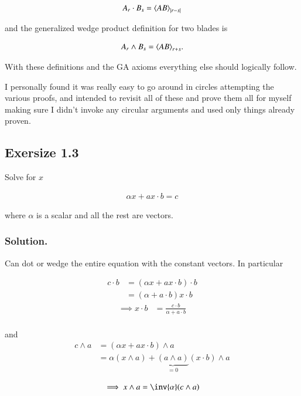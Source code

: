 \documentclass{article}
\begin{document}
\begin{align}\label{eqn:generalDot}
A_r \cdot B_s = {\left\langle{{A B}}\right\rangle}_{{\left\lvert{r -s}\right\rvert}}
\end{align}

and the generalized wedge product definition for two blades is 

\begin{align}\label{eqn:generalWedge}
A_r \wedge B_s = {\left\langle{{A B}}\right\rangle}_{r + s}.
\end{align}

With these definitions and the GA axioms everything else should logically follow.

I personally found it was really easy to go around in circles attempting the various proofs, and intended to revisit all of these
and prove them all for myself making sure I didn't invoke any circular arguments and used only things already proven.

\subsection{ Exersize 1.3 }

Solve for $x$

\begin{align*}
\alpha x + a x \cdot b = c
\end{align*}

where $\alpha$ is a scalar and all the rest are vectors.

\subsubsection{ Solution. }

Can dot or wedge the entire equation with the constant vectors.  In particular

\begin{align*}
c \cdot b &= (\alpha x + a x \cdot b) \cdot b \\ 
&= (\alpha + a \cdot b) x \cdot b 
\end{align*}
\begin{align*}
\implies
x \cdot b &= \frac{c \cdot b}{\alpha + a \cdot b} \\
\end{align*}

and
\begin{align*}
c \wedge a &= (\alpha x + a x \cdot b) \wedge a \\ 
&= \alpha (x \wedge a) + \underbrace{(a \wedge a)}_{=0} (x \cdot b) \wedge a \\
\end{align*}
\begin{align*}
\implies
x \wedge a &= \inv{\alpha} (c \wedge a) \\
\end{align*}
\end{document}
